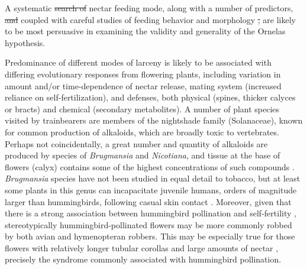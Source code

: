 \documentclass[fleqn,10pt,lineno]{wlpeerj}
\providecommand{\DIFaddtex}[1]{{\protect\color{blue}\uwave{#1}}} %
\providecommand{\DIFdeltex}[1]{{\protect\color{red}\sout{#1}}}                      %
\providecommand{\DIFaddbegin}{} %
\providecommand{\DIFaddend}{} %
\providecommand{\DIFdelbegin}{} %
\providecommand{\DIFdelend}{} %
\providecommand{\DIFadd}[1]{\texorpdfstring{\DIFaddtex{#1}}{#1}} %
\providecommand{\DIFdel}[1]{\texorpdfstring{\DIFdeltex{#1}}{}} %
\begin{document}
A systematic \DIFdelbegin \DIFdel{search of }\DIFdelend \DIFaddbegin \DIFadd{recording of the }\DIFaddend nectar feeding mode, along with a number of predictors, \DIFdelbegin \DIFdel{and }\DIFdelend coupled with careful studies of feeding behavior and morphology \DIFdelbegin \DIFdel{, }\DIFdelend are likely to be most persuasive in examining the validity and generality of the Ornelas hypothesis.

%
%

Predominance of different modes of larceny is likely to be associated with differing evolutionary responses from flowering plants, including variation in amount and/or time-dependence of nectar release, mating system (increased reliance on self-fertilization), and defenses, both physical (spines, thicker calyces or bracts) and chemical (secondary metabolites). 
A number of plant species visited by trainbearers are members of the nightshade family (Solanaceae), known for common production of alkaloids, which are broadly toxic to vertebrates. 
Perhaps not coincidentally, a great number and quantity of alkaloids are produced by species of \textit{Brugmansia} and \textit{Nicotiana}, and tissue at the base of flowers (calyx) contains some of the highest concentrations of such compounds \citep{saitoh1985, alves2007}. 
\textit{Brugmansia} species have not been studied in equal detail to tobacco, but at least some plants in this genus can incapacitate juvenile humans, orders of magnitude larger than hummingbirds, following casual skin contact \citep{andreola2008}. 
Moreover, given that there is a strong association between hummingbird pollination and self-fertility \citep{wolowski2013}, stereotypically hummingbird-pollinated flowers may be more commonly robbed by both avian and hymenopteran robbers. 
This may be especially true for those flowers with relatively longer tubular corollas and large amounts of nectar \citep{lara2001,rojas-nossa2016}, precisely the syndrome commonly associated with hummingbird pollination.
\end{document}

